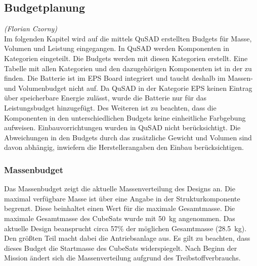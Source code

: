 				\subsection{Budgetplanung}
				\hfill\emph{(Florian Czorny)}\\
Im folgenden Kapitel wird auf die mittels QuSAD erstellten Budgets für Masse, Volumen und Leistung eingegangen. In QuSAD werden Komponenten in Kategorien eingeteilt. Die Budgets werden mit diesen Kategorien erstellt. Eine Tabelle mit allen Kategorien und den dazugehörigen Komponenten ist in der  zu finden. Die Batterie ist im EPS Board integriert und taucht deshalb im Massen- und Volumenbudget nicht auf. Da QuSAD in der Kategorie EPS keinen Eintrag über speicherbare Energie zulässt, wurde die Batterie nur für das Leistungsbudget hinzugefügt. Des Weiteren ist zu beachten, dass die Komponenten in den unterschiedlichen Budgets keine einheitliche Farbgebung aufweisen. Einbauvorrichtungen wurden in QuSAD nicht berücksichtigt. Die Abweichungen in den Budgets durch das  zusätzliche Gewicht und Volumen sind davon abhängig, inwiefern die Herstellerangaben den Einbau berücksichtigen.

						\subsubsection{Massenbudget}
						
Das Massenbudget  zeigt die aktuelle Massenverteilung des Designs an. Die maximal verfügbare Masse ist über eine Angabe in der Strukturkomponente begrenzt. Diese beinhaltet einen Wert für die maximale Gesamtmasse. Die maximale Gesamtmasse des CubeSats wurde mit \SI{50}{\kilogram} angenommen. Das aktuelle Design beansprucht circa \num{57}\% der möglichen Gesamtmasse (\SI{28,5}{\kilogram}). Den größten Teil macht dabei die Antriebsanlage aus. Es gilt zu beachten, dass dieses Budget die Startmasse des CubeSats widerspiegelt. Nach Beginn der Mission ändert sich die Massenverteilung aufgrund des Treibstoffverbrauchs.
										
								
